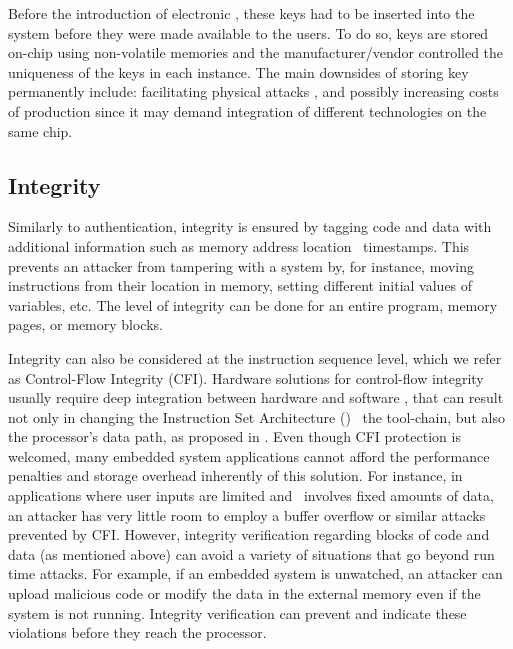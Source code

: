 Before the introduction of electronic \pufs \cite{Gassend2002:PUFs}, these keys had to be inserted into the system before they were made available to the users. To do so, keys are stored on-chip using non-volatile memories and the manufacturer\slash{}vendor controlled the uniqueness of the keys in each instance. The main downsides of storing key permanently include: facilitating physical attacks \cite{Sadeghi2010:Security-PUFs}, and possibly increasing costs of production since it may demand integration of different technologies on the same chip.

\subsection{Integrity}
\label{subsec:integrity}
Similarly to authentication, integrity is ensured by tagging code and data with additional information such as memory address location \andor~timestamps. This prevents an attacker from tampering with a system by, for instance, moving instructions from their location in memory, setting different initial values of variables, etc. The level of integrity can be done for an entire program, memory pages, or memory blocks. 

Integrity can also be considered at the instruction sequence level, which we refer as Control-Flow Integrity (CFI). Hardware solutions for control-flow integrity usually require deep integration between hardware and software \cite{Davi2015:HAFIX}, that can result not only in changing the Instruction Set Architecture (\isa) \andor~the tool-chain, but also the processor's data path, as proposed in \cite{Gelbart2005:CODESSEAL, Kanuparthi2012:DynamicIntegrity}. Even though CFI protection is welcomed, many embedded system applications cannot afford the performance penalties and storage overhead inherently of this solution. For instance, in applications where user inputs are limited and \io~involves fixed amounts of data, an attacker has very little room to employ a buffer overflow or similar attacks prevented by CFI. However, integrity verification regarding blocks of code and data (as mentioned above) can avoid a variety of situations that go beyond run time attacks. For example, if an embedded system is unwatched, an attacker can upload malicious code or modify the data in the external memory even if the system is not running. Integrity verification can prevent and indicate these violations before they reach the processor.



